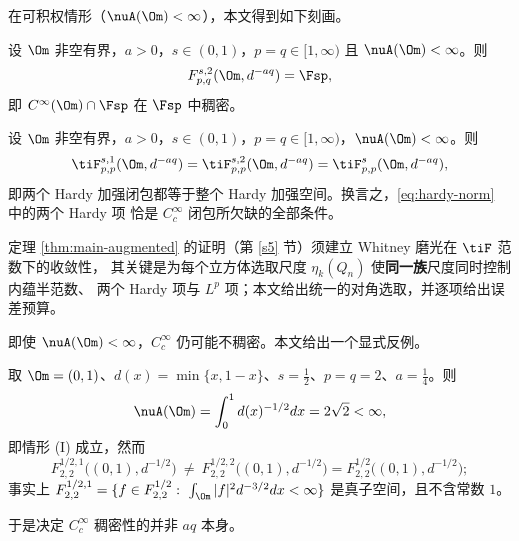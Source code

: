 在可积权情形（$\nuA(\Om)<\infty$），本文得到如下刻画。

\begin{theorem}\label{thm:smooth-dense}
设 $\Om$ 非空有界，$a>0$，$s\in(0,1)$，$p=q\in[1,\infty)$ 且 $\nuA(\Om)<\infty$。则
\begin{equation}\label{eq:smooth-dense}
  F^{s,2}_{p,q}(\Om,d^{-aq})=\Fsp ,
\end{equation}
即 $C^\infty(\Om)\cap\Fsp$ 在 $\Fsp$ 中稠密。
\end{theorem}

\begin{theorem}\label{thm:main-augmented}
设 $\Om$ 非空有界，$a>0$，$s\in(0,1)$，$p=q\in[1,\infty)$，$\nuA(\Om)<\infty$。则
\begin{equation}\label{eq:main-augmented}
  \tiF^{s,1}_{p,p}(\Om,d^{-aq})=\tiF^{s,2}_{p,p}(\Om,d^{-aq})=\tiF^{s}_{p,p}(\Om,d^{-aq}),
\end{equation}
即两个 Hardy 加强闭包都等于整个 Hardy 加强空间。换言之，\eqref{eq:hardy-norm} 中的两个 Hardy 项
恰是 $C_c^\infty$ 闭包所欠缺的全部条件。
\end{theorem}

定理 \ref{thm:main-augmented} 的证明（第 \ref{s5} 节）须建立 Whitney 磨光在 $\tiF$ 范数下的收敛性，
其关键是为每个立方体选取尺度 $\eta_k(Q_n)$ 使\textbf{同一族}尺度同时控制内蕴半范数、
两个 Hardy 项与 $L^p$ 项；本文给出统一的对角选取，并逐项给出误差预算。

即使 $\nuA(\Om)<\infty$，$C_c^\infty$ 仍可能不稠密。本文给出一个显式反例。

\begin{theorem}\label{thm:interval}
取 $\Om=(0,1)$、$d(x)=\min\{x,1-x\}$、$s=\tfrac12$、$p=q=2$、$a=\tfrac14$。则
\begin{equation}\label{eq:interval}
  \nuA(\Om)=\int_0^1 d(x)^{-1/2}dx=2\sqrt2<\infty ,
\end{equation}
即情形 (I) 成立，然而
\begin{equation}\label{eq:interval-closure}
  F^{1/2,1}_{2,2}\big((0,1),d^{-1/2}\big)\ \ne\ F^{1/2,2}_{2,2}\big((0,1),d^{-1/2}\big)=F^{1/2}_{2,2}\big((0,1),d^{-1/2}\big);
\end{equation}
事实上 $F^{1/2,1}_{2,2}=\{f\in F^{1/2}_{2,2}:\ \int_\Om|f|^2d^{-3/2}dx<\infty\}$ 是真子空间，且不含常数 $1$。
\end{theorem}

于是决定 $C_c^\infty$ 稠密性的并非 $aq$ 本身。

